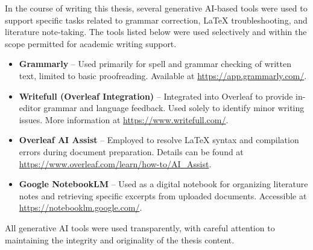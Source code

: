 \documentclass[draft,final]{vutinfth} %
\begin{document}

\tableofcontents %

\mainmatter












\backmatter

\begin{aitools}

In the course of writing this thesis, several generative AI-based tools were used to support specific tasks related to grammar correction, LaTeX troubleshooting, and literature note-taking. The tools listed below were used selectively and within the scope permitted for academic writing support.

\begin{itemize}
    \item \textbf{Grammarly} -- Used primarily for spell and grammar checking of written text, limited to basic proofreading. Available at \url{https://app.grammarly.com/}.
    
    \item \textbf{Writefull (Overleaf Integration)} -- Integrated into Overleaf to provide in-editor grammar and language feedback. Used solely to identify minor writing issues. More information at \url{https://www.writefull.com/}.
    
    \item \textbf{Overleaf AI Assist} -- Employed to resolve LaTeX syntax and compilation errors during document preparation. Details can be found at \url{https://www.overleaf.com/learn/how-to/AI_Assist}.
    
    \item \textbf{Google NotebookLM} -- Used as a digital notebook for organizing literature notes and retrieving specific excerpts from uploaded documents. Accessible at \url{https://notebooklm.google.com/}.
\end{itemize}

All generative AI tools were used transparently, with careful attention to maintaining the integrity and originality of the thesis content.
\end{aitools}
\end{document}
